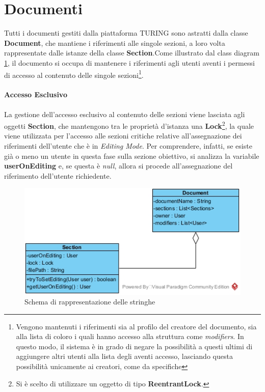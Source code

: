 \section{Documenti}
Tutti i documenti gestiti dalla piattaforma TURING sono astratti dalla classe \textbf{Document}, che mantiene i riferimenti alle singole sezioni, a loro volta rappresentate dalle istanze della classe \textbf{Section}.Come illustrato dal class diagram \ref{fig:document_class_diagram}, il documento si occupa di mantenere i riferimenti agli utenti aventi i permessi di accesso al contenuto delle singole sezioni\footnote{Vengono mantenuti i riferimenti sia al profilo del creatore del documento, sia alla lista di coloro i quali hanno accesso alla struttura come \textit{modifiers}. In questo modo, il sistema è in grado di negare la possibilità a questi ultimi di aggiungere altri utenti alla lista degli aventi accesso, lasciando questa possibilità unicamente ai creatori, come da specifiche}.
\paragraph{Accesso Esclusivo}
La gestione dell'accesso esclusivo al contenuto delle sezioni viene lasciata agli oggetti \textbf{Section}, che mantengono tra le proprietà d'istanza una \textbf{Lock}\footnote{Si è scelto di utilizzare un oggetto di tipo \textbf{ReentrantLock}.}, la quale viene utilizzata per l'accesso alle sezioni critiche relative all'assegnazione dei riferimenti dell'utente che è in \textit{Editing Mode}. Per comprendere, infatti, se esiste già o meno un utente in questa fase sulla sezione obiettivo, si analizza la variabile \textbf{userOnEditing} e, se questa è \textit{null}, allora si procede all'assegnazione del riferimento dell'utente richiedente.

\begin{figure}[h]
	\caption{Schema di rappresentazione delle stringhe}
	\label{fig:document_class_diagram}
	\centering
	\includegraphics[scale=0.7]{assets/document_class_diagram.jpg}
\end{figure}

